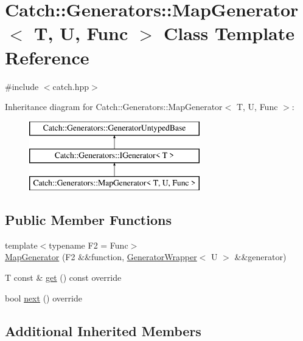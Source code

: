 \hypertarget{class_catch_1_1_generators_1_1_map_generator}{}\section{Catch\+:\+:Generators\+:\+:Map\+Generator$<$ T, U, Func $>$ Class Template Reference}
\label{class_catch_1_1_generators_1_1_map_generator}


{\ttfamily \#include $<$catch.\+hpp$>$}

Inheritance diagram for Catch\+:\+:Generators\+:\+:Map\+Generator$<$ T, U, Func $>$\+:\begin{figure}[H]
\begin{center}
\leavevmode
\includegraphics[height=3.000000cm]{class_catch_1_1_generators_1_1_map_generator}
\end{center}
\end{figure}
\subsection*{Public Member Functions}
\begin{DoxyCompactItemize}
\item 
{\footnotesize template$<$typename F2  = Func$>$ }\\\mbox{\hyperlink{class_catch_1_1_generators_1_1_map_generator_a525c7eaf53ad220ee7add534aff2522c}{Map\+Generator}} (F2 \&\&function, \mbox{\hyperlink{class_catch_1_1_generators_1_1_generator_wrapper}{Generator\+Wrapper}}$<$ U $>$ \&\&generator)
\item 
T const  \& \mbox{\hyperlink{class_catch_1_1_generators_1_1_map_generator_a199d377afba00519f202c59b4b488235}{get}} () const override
\item 
bool \mbox{\hyperlink{class_catch_1_1_generators_1_1_map_generator_aa07e2f12d38ae060c30cc30d9dc236c5}{next}} () override
\end{DoxyCompactItemize}
\subsection*{Additional Inherited Members}


